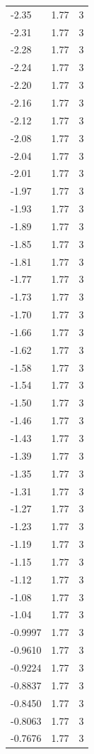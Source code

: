 \begin{longtable}{lrr}
  -2.35 & 1.77 & 3 \\
  -2.31 & 1.77 & 3 \\
  -2.28 & 1.77 & 3 \\
  -2.24 & 1.77 & 3 \\
  -2.20 & 1.77 & 3 \\
  -2.16 & 1.77 & 3 \\
  -2.12 & 1.77 & 3 \\
  -2.08 & 1.77 & 3 \\
  -2.04 & 1.77 & 3 \\
  -2.01 & 1.77 & 3 \\
  -1.97 & 1.77 & 3 \\
  -1.93 & 1.77 & 3 \\
  -1.89 & 1.77 & 3 \\
  -1.85 & 1.77 & 3 \\
  -1.81 & 1.77 & 3 \\
  -1.77 & 1.77 & 3 \\
  -1.73 & 1.77 & 3 \\
  -1.70 & 1.77 & 3 \\
  -1.66 & 1.77 & 3 \\
  -1.62 & 1.77 & 3 \\
  -1.58 & 1.77 & 3 \\
  -1.54 & 1.77 & 3 \\
  -1.50 & 1.77 & 3 \\
  -1.46 & 1.77 & 3 \\
  -1.43 & 1.77 & 3 \\
  -1.39 & 1.77 & 3 \\
  -1.35 & 1.77 & 3 \\
  -1.31 & 1.77 & 3 \\
  -1.27 & 1.77 & 3 \\
  -1.23 & 1.77 & 3 \\
  -1.19 & 1.77 & 3 \\
  -1.15 & 1.77 & 3 \\
  -1.12 & 1.77 & 3 \\
  -1.08 & 1.77 & 3 \\
  -1.04 & 1.77 & 3 \\
  -0.9997 & 1.77 & 3 \\
  -0.9610 & 1.77 & 3 \\
  -0.9224 & 1.77 & 3 \\
  -0.8837 & 1.77 & 3 \\
  -0.8450 & 1.77 & 3 \\
  -0.8063 & 1.77 & 3 \\
  -0.7676 & 1.77 & 3 \\

\end{longtable}
